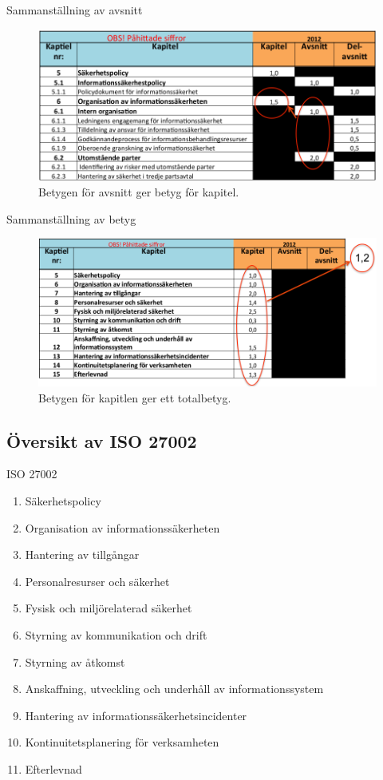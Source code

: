 \documentclass{beamer}
\begin{document}
\begin{frame}{Sammanställning av avsnitt}
  \begin{figure}
    \includegraphics[width=\textwidth]{gap-kapitel.png}
    \caption{Betygen för avsnitt ger betyg för kapitel.}
  \end{figure}
\end{frame}

\begin{frame}{Sammanställning av betyg}
  \begin{figure}
    \includegraphics[width=\textwidth]{gap-betyg.png}
    \caption{Betygen för kapitlen ger ett totalbetyg.}
  \end{figure}
\end{frame}

\subsection{Översikt av ISO 27002}

\begin{frame}{ISO 27002}
  \begin{enumerate}
    \item Säkerhetspolicy
    \item Organisation av informationssäkerheten
    \item Hantering av tillgångar
    \item Personalresurser och säkerhet
    \item Fysisk och miljörelaterad säkerhet
    \item Styrning av kommunikation och drift
    \item Styrning av åtkomst
    \item Anskaffning, utveckling och underhåll av informationssystem
    \item Hantering av informationssäkerhetsincidenter
    \item Kontinuitetsplanering för verksamheten
    \item Efterlevnad
  \end{enumerate}
\end{frame}
\end{document}
